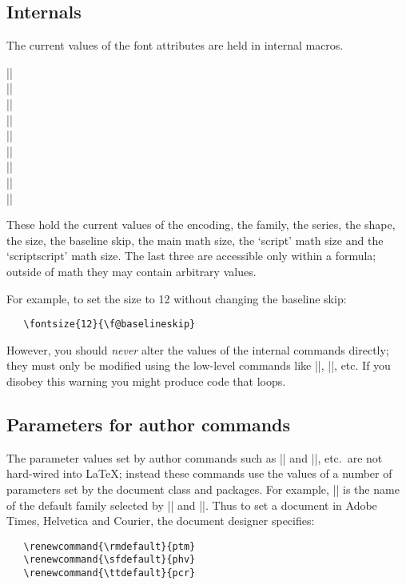 \documentclass{ltxguide}[1995/11/28]
\begin{document}
 
\subsection{Internals}
 
The current values of the font attributes are held in internal macros.
 
\begin{decl}
      |\f@encoding| \\
      |\f@family|  \\
      |\f@series|  \\
      |\f@shape|  \\
      |\f@size|    \\
      |\f@baselineskip| \\
      |\tf@size|  \\
      |\sf@size|  \\
      |\ssf@size|
\end{decl}
 
These hold the current values of the encoding, the family, the series,
the shape, the size, the baseline skip, the main math size, the
`script' math size and the `scriptscript' math size. The last three
are accessible only within a formula; outside of math they may contain
arbitrary values.
 
For example, to set the size to 12 without
changing the baseline skip:
\begin{verbatim}
   \fontsize{12}{\f@baselineskip}
\end{verbatim}
However, you should \emph{never} alter the values of the internal
commands directly; they must only be modified using the low-level
commands like |\fontfamily|, |\fontseries|, etc. If you disobey this
warning you might produce code that loops.
 
\subsection{Parameters for author commands}
\label{Sec:text.param}
 
The parameter values set by author commands such as |\textrm| and
|\rmfamily|, etc.\ are not hard-wired into \LaTeX; instead these
commands use the values of a number of parameters set by the document
class and packages.  For example, |\rmdefault| is the name of the
default family selected by |\textrm| and |\rmfamily|. Thus to set a
document in Adobe Times, Helvetica and Courier, the document designer
specifies:
\begin{verbatim}
   \renewcommand{\rmdefault}{ptm}
   \renewcommand{\sfdefault}{phv}
   \renewcommand{\ttdefault}{pcr}
\end{verbatim}
 
\end{document}
